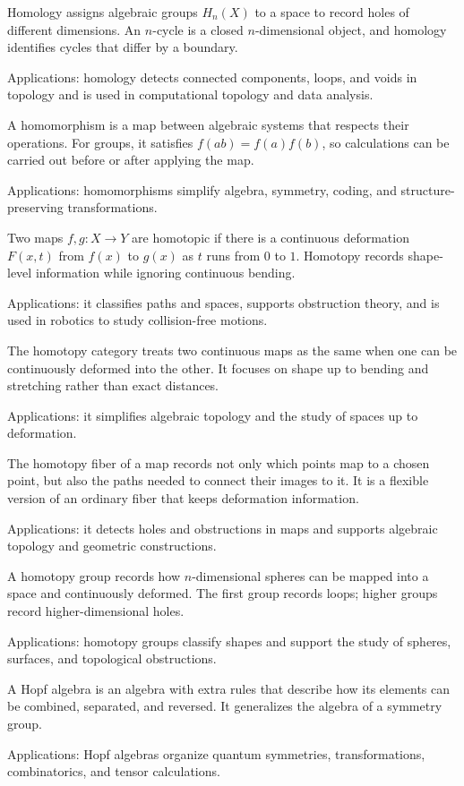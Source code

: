 Homology assigns algebraic groups $H_n(X)$ to a space to record holes of different dimensions. An $n$-cycle is a closed $n$-dimensional object, and homology identifies cycles that differ by a boundary. \par\noindent Applications: homology detects connected components, loops, and voids in topology and is used in computational topology and data analysis.

A homomorphism is a map between algebraic systems that respects their operations. For groups, it satisfies $f(ab)=f(a)f(b)$, so calculations can be carried out before or after applying the map. \par\noindent Applications: homomorphisms simplify algebra, symmetry, coding, and structure-preserving transformations.

Two maps $f,g:X\to Y$ are homotopic if there is a continuous deformation $F(x,t)$ from $f(x)$ to $g(x)$ as $t$ runs from $0$ to $1$. Homotopy records shape-level information while ignoring continuous bending. \par\noindent Applications: it classifies paths and spaces, supports obstruction theory, and is used in robotics to study collision-free motions.

The homotopy category treats two continuous maps as the same when one can be continuously deformed into the other. It focuses on shape up to bending and stretching rather than exact distances. \par\noindent Applications: it simplifies algebraic topology and the study of spaces up to deformation.

The homotopy fiber of a map records not only which points map to a chosen point, but also the paths needed to connect their images to it. It is a flexible version of an ordinary fiber that keeps deformation information. \par\noindent Applications: it detects holes and obstructions in maps and supports algebraic topology and geometric constructions.

A homotopy group records how $n$-dimensional spheres can be mapped into a space and continuously deformed. The first group records loops; higher groups record higher-dimensional holes. \par\noindent Applications: homotopy groups classify shapes and support the study of spheres, surfaces, and topological obstructions.

A Hopf algebra is an algebra with extra rules that describe how its elements can be combined, separated, and reversed. It generalizes the algebra of a symmetry group. \par\noindent Applications: Hopf algebras organize quantum symmetries, transformations, combinatorics, and tensor calculations.

